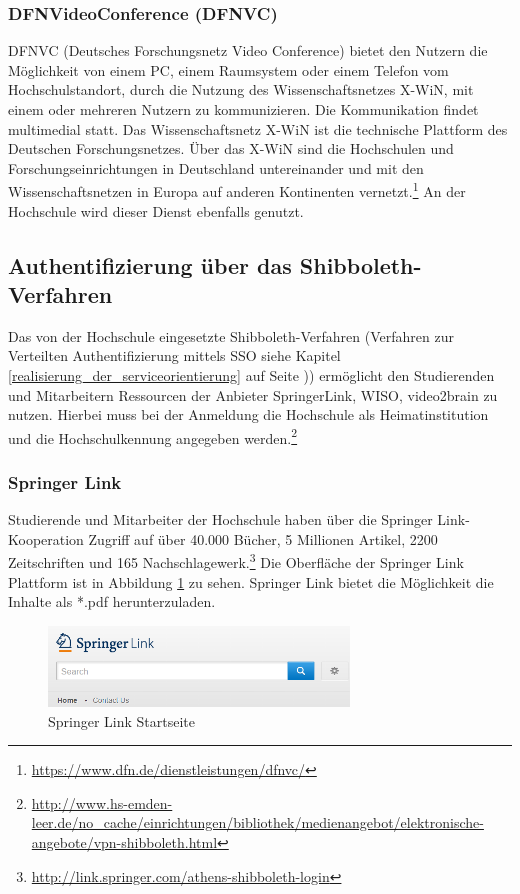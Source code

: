 \subsubsection{DFNVideoConference (DFNVC)}
DFNVC (Deutsches Forschungsnetz Video Conference) bietet den Nutzern die Möglichkeit von einem PC, einem Raumsystem oder einem Telefon vom Hochschulstandort, durch die Nutzung des Wissenschaftsnetzes X-WiN, mit einem oder mehreren Nutzern zu kommunizieren. Die Kommunikation findet multimedial statt. Das Wissenschaftsnetz X-WiN ist die technische Plattform des Deutschen Forschungsnetzes. Über das X-WiN sind die Hochschulen und Forschungseinrichtungen in Deutschland untereinander und mit den Wissenschaftsnetzen in Europa auf anderen Kontinenten vernetzt.\footnote{\url{https://www.dfn.de/dienstleistungen/dfnvc/}} An der Hochschule wird dieser Dienst ebenfalls genutzt.

\subsection{Authentifizierung über das Shibboleth-Verfahren}
Das von der Hochschule eingesetzte Shibboleth-Verfahren (Verfahren zur Verteilten Authentifizierung mittels SSO siehe Kapitel \ref{realisierung_der_serviceorientierung} auf Seite \pageref{realisierung_der_serviceorientierung})) ermöglicht den Studierenden und Mitarbeitern Ressourcen der Anbieter SpringerLink, WISO, video2brain zu nutzen. Hierbei muss bei der Anmeldung die Hochschule als Heimatinstitution und die Hochschulkennung angegeben werden.\footnote{\url{http://www.hs-emden-leer.de/no_cache/einrichtungen/bibliothek/medienangebot/elektronische-angebote/vpn-shibboleth.html}}

\subsubsection{Springer Link}
Studierende und Mitarbeiter der Hochschule haben über die Springer Link-Kooperation Zugriff auf über 40.000 Bücher, 5 Millionen Artikel, 2200 Zeitschriften und 165 Nachschlagewerk.\footnote{\url{http://link.springer.com/athens-shibboleth-login}} Die Oberfläche der Springer Link Plattform ist in Abbildung \ref{fig_springerlink_startseite} zu sehen. Springer Link bietet die Möglichkeit die Inhalte als *.pdf herunterzuladen. 

\begin{figure}[h!]
	\centering
	\includegraphics[width=8cm]{kapitel/gruppe2/bilder/springerlink_startseite}
	\caption{Springer Link Startseite}
	\label{fig_springerlink_startseite}
\end{figure}

